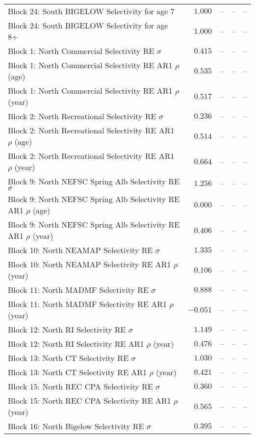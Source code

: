 \documentclass[
]{article}
\begin{document}
\begin{landscape}
\begin{longtable}[t]{lrrrr}
Block 24: South BIGELOW Selectivity for age 7 & $1.000$ & -- & -- & --\\
Block 24: South BIGELOW Selectivity for age 8+ & $1.000$ & -- & -- & --\\
Block 1: North Commercial Selectivity RE $\sigma$ & $0.415$ & -- & -- & --\\
\addlinespace
Block 1: North Commercial Selectivity RE AR1 $\rho$ (age) & $0.535$ & -- & -- & --\\
Block 1: North Commercial Selectivity RE AR1 $\rho$ (year) & $0.517$ & -- & -- & --\\
Block 2: North Recreational Selectivity RE $\sigma$ & $0.236$ & -- & -- & --\\
Block 2: North Recreational Selectivity RE AR1 $\rho$ (age) & $0.514$ & -- & -- & --\\
Block 2: North Recreational Selectivity RE AR1 $\rho$ (year) & $0.664$ & -- & -- & --\\
\addlinespace
Block 9: North NEFSC Spring Alb Selectivity RE $\sigma$ & $1.256$ & -- & -- & --\\
Block 9: North NEFSC Spring Alb Selectivity RE AR1 $\rho$ (age) & $0.000$ & -- & -- & --\\
Block 9: North NEFSC Spring Alb Selectivity RE AR1 $\rho$ (year) & $0.406$ & -- & -- & --\\
Block 10: North NEAMAP Selectivity RE $\sigma$ & $1.335$ & -- & -- & --\\
Block 10: North NEAMAP Selectivity RE AR1 $\rho$ (year) & $0.106$ & -- & -- & --\\
\addlinespace
Block 11: North MADMF Selectivity RE $\sigma$ & $0.888$ & -- & -- & --\\
Block 11: North MADMF Selectivity RE AR1 $\rho$ (year) & $-0.051$ & -- & -- & --\\
Block 12: North RI Selectivity RE $\sigma$ & $1.149$ & -- & -- & --\\
Block 12: North RI Selectivity RE AR1 $\rho$ (year) & $0.476$ & -- & -- & --\\
Block 13: North CT Selectivity RE $\sigma$ & $1.030$ & -- & -- & --\\
\addlinespace
Block 13: North CT Selectivity RE AR1 $\rho$ (year) & $0.421$ & -- & -- & --\\
Block 15: North REC CPA Selectivity RE $\sigma$ & $0.360$ & -- & -- & --\\
Block 15: North REC CPA Selectivity RE AR1 $\rho$ (year) & $0.565$ & -- & -- & --\\
Block 16: North Bigelow Selectivity RE $\sigma$ & $0.395$ & -- & -- & --\\

\end{longtable}
\end{landscape}
\end{document}
